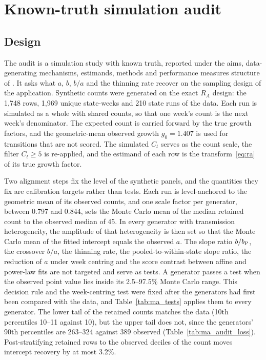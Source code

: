 \section{Known-truth simulation audit}
\label{app:audit}

\subsection{Design}
\label{app:audit-design}

The audit is a simulation study with known truth, reported under the aims, data-generating mechanisms, estimands, methods and performance measures structure of \citet{morris2019using}. It asks what $a$, $b$, $b/a$ and the thinning rate recover on the sampling design of the application. Synthetic counts were generated on the exact $R_A$ design: the 1,748 rows, 1,969 unique state-weeks and 210 state runs of the data. Each run is simulated as a whole with shared counts, so that one week's count is the next week's denominator. The expected count is carried forward by the true growth factors, and the geometric-mean observed growth $g_0=1.407$ is used for transitions that are not scored. The simulated $C_t$ serves as the count scale, the filter $C_t\ge5$ is re-applied, and the estimand of each row is the transform~\eqref{eq:ra} of its true growth factor.

Two alignment steps fix the level of the synthetic panels, and the quantities they fix are calibration targets rather than tests. Each run is level-anchored to the geometric mean of its observed counts, and one scale factor per generator, between 0.797 and 0.844, sets the Monte Carlo mean of the median retained count to the observed median of 45. In every generator with transmission heterogeneity, the amplitude of that heterogeneity is then set so that the Monte Carlo mean of the fitted intercept equals the observed $a$. The slope ratio $b/b_{\mathrm P}$, the crossover $b/a$, the thinning rate, the pooled-to-within-state slope ratio, the reduction of $a$ under week centring and the score contrast between affine and power-law fits are not targeted and serve as tests. A generator passes a test when the observed point value lies inside its 2.5--97.5\% Monte Carlo range. This decision rule and the week-centring test were fixed after the generators had first been compared with the data, and Table~\ref{tab:ma_tests} applies them to every generator. The lower tail of the retained counts matches the data (10th percentiles 10--11 against 10), but the upper tail does not, since the generators' 90th percentiles are 263--324 against 389 observed (Table~\ref{tab:ma_audit_loss}). Post-stratifying retained rows to the observed deciles of the count moves intercept recovery by at most 3.2\%.

